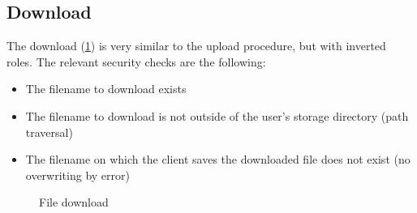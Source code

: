 \subsection{Download}
The download (\cref{fig:transport_protocol_file_download}) is very similar to the upload procedure, but with inverted roles.
The relevant security checks are the following:
\begin{itemize}
    \item The filename to download exists
    \item The filename to download is not outside of the user's storage directory (path traversal)
    \item The filename on which the client saves the downloaded file does not exist (no overwriting by error)
\end{itemize}
\begin{figure}
    \centering
    \setlength{\instdist}{8.5cm}
    \setmscoptions
    \begin{msc}{}



        \nextlevel[2]

        \nextlevel[3]

        \nextlevel

        \nextlevel[5]
        \nextlevel[2]
        \nextlevel[2]

        \nextlevel
    \end{msc}
    \centering
    \caption{File download}
    \label{fig:transport_protocol_file_download}
\end{figure}


